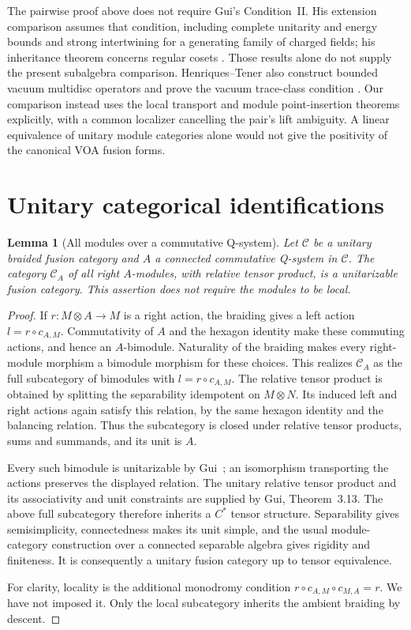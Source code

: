 \documentclass[11pt,a4paper]{article}
\newtheorem{lemma}[theorem]{Lemma}
\theoremstyle{definition}
\begin{document}
The pairwise proof above does not require Gui's Condition~II.  His
extension comparison assumes that condition, including complete
unitarity and energy bounds and strong intertwining for a generating
family of charged fields; his inheritance theorem concerns regular
cosets \cite[Definition~4.15 and Theorems~4.20,~6.11]{GuiCompare}.
Those results alone do not supply the present subalgebra comparison.
Henriques--Tener also construct bounded vacuum
multidisc operators and prove the vacuum trace-class condition
\cite[Theorems~3.6 and~4.1]{HTGenusZero}.  Our comparison instead uses
the local transport and module point-insertion theorems explicitly,
with a common localizer cancelling the pair's lift ambiguity.  A linear
equivalence of unitary module categories alone would not give the
positivity of the canonical VOA fusion forms.

\section{Unitary categorical identifications}
\label{sec:analytic-category}

\begin{lemma}[All modules over a commutative Q-system]
\label{lem:analytic-unitary-all-modules}
Let $\mathcal C$ be a unitary braided fusion category and $A$ a
connected commutative Q-system in $\mathcal C$.  The category
$\mathcal C_A$ of all right $A$-modules, with relative tensor product,
is a unitarizable fusion category.  This assertion does not require
the modules to be local.
\end{lemma}
\begin{proof}
If $r:M\otimes A\to M$ is a right action, the braiding gives a left
action $l=r\circ c_{A,M}$.  Commutativity of $A$ and the hexagon
identity make these commuting actions, and hence an $A$-bimodule.
Naturality of the braiding makes every right-module morphism a
bimodule morphism for these choices.  This realizes $\mathcal C_A$
as the full subcategory of bimodules with $l=r\circ c_{A,M}$.
The relative tensor product is obtained by splitting the separability
idempotent on $M\otimes N$.  Its induced left and right actions again
satisfy this relation, by the same hexagon identity and the balancing
relation.  Thus the subcategory is closed under relative tensor
products, sums and summands, and its unit is $A$.

Every such bimodule is unitarizable by
Gui~\cite[Theorem~2.28]{Gui}; an isomorphism transporting the actions preserves
the displayed relation.  The unitary relative tensor product and its
associativity and unit constraints are supplied by Gui, Theorem~3.13.
The above full subcategory therefore inherits a $C^*$ tensor structure.
Separability gives semisimplicity, connectedness makes its unit simple,
and the usual module-category construction over a connected separable
algebra gives rigidity and finiteness.  It is consequently a unitary
fusion category up to tensor equivalence.

For clarity, locality is the additional monodromy condition
$r\circ c_{A,M}\circ c_{M,A}=r$.  We have not imposed it.  Only the
local subcategory inherits the ambient braiding by descent.
\end{proof}
\end{document}
